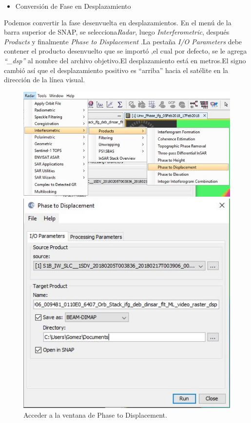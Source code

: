 \documentclass{article}
\begin{document}
\begin{itemize}
    \item Conversión de Fase en Desplazamiento
\end{itemize}
Podemos convertir la fase desenvuelta en desplazamientos. En el menú de la barra superior de SNAP, se selecciona\textit{Radar}, luego \textit{Interferometric}, después \textit{Products}  y finalmente \textit{Phase to Displacement} .La pestaña \textit{I/O Parameters}  debe contener el producto desenvuelto que se importó ,el cual por defecto, se le agrega \textit{“\_dsp”}  al nombre del archivo objetivo.El desplazamiento está en metros.El signo cambió así que el desplazamiento positivo es “arriba” hacia el satélite en la dirección de la línea visual.
\begin{figure}[htbp]
\begin{minipage}[b]{0.6\linewidth}
\centering
\includegraphics[width=\linewidth]{Imagen/19.JPG}
\caption{Acceder a la ventana de Phase to Displacement.}
\label{fig:figura19}
\end{minipage}
\hspace{0.5cm}
\begin{minipage}[b]{0.5\linewidth}
\centering
\includegraphics[width=\linewidth]{Imagen/18.JPG}

\end{minipage}
\end{figure}
\end{document}
